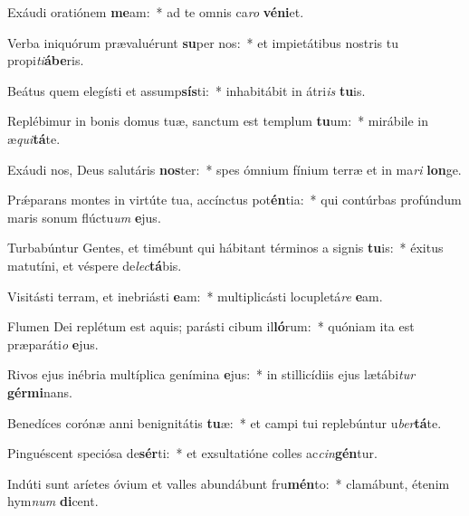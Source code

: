 \item Exáudi oratiónem \textbf{me}am:~* ad te omnis ca\textit{ro} \textbf{vé}\textbf{ni}et.
\item Verba iniquórum prævaluérunt \textbf{su}per nos:~* et impietátibus nostris tu propi\textit{ti}\textbf{á}\textbf{be}ris.
\item Beátus quem elegísti et assump\textbf{sís}ti:~* inhabitábit in átri\textit{is} \textbf{tu}is.
\item Replébimur in bonis domus tuæ, sanctum est templum \textbf{tu}um:~* mirábile in æ\textit{qui}\textbf{tá}te.
\item Exáudi nos, Deus salutáris \textbf{nos}ter:~* spes ómnium fínium terræ et in ma\textit{ri} \textbf{lon}ge.
\item Prǽparans montes in virtúte tua, accínctus pot\textbf{én}tia:~* qui contúrbas profúndum maris sonum flúctu\textit{um} \textbf{e}jus.
\item Turbabúntur Gentes, et timébunt qui hábitant términos a signis \textbf{tu}is:~* éxitus matutíni, et véspere de\textit{lec}\textbf{tá}bis.
\item Visitásti terram, et inebriásti \textbf{e}am:~* multiplicásti locupletá\textit{re} \textbf{e}am.
\item Flumen Dei replétum est aquis; parásti cibum il\textbf{ló}rum:~* quóniam ita est præparáti\textit{o} \textbf{e}jus.
\item Rivos ejus inébria multíplica genímina \textbf{e}jus:~* in stillicídiis ejus lætábi\textit{tur} \textbf{gér}\textbf{mi}nans.
\item Benedíces corónæ anni benignitátis \textbf{tu}æ:~* et campi tui replebúntur u\textit{ber}\textbf{tá}te.
\item Pinguéscent speciósa de\textbf{sér}ti:~* et exsultatióne colles ac\textit{cin}\textbf{gén}tur.
\item Indúti sunt aríetes óvium et valles abundábunt fru\textbf{mén}to:~* clamábunt, étenim hym\textit{num} \textbf{di}cent.
